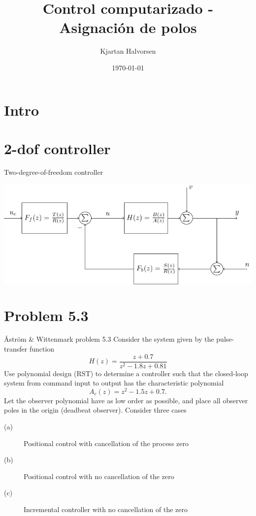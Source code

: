 \documentclass[presentation,aspectratio=169]{beamer}
\author{Kjartan Halvorsen}
\date{\today}
\title{Control computarizado - Asignación de polos}
\begin{document}
\maketitle

\section{Intro}
\label{sec:org70d5d08}


\section{2-dof controller}
\label{sec:org70b8192}

\begin{frame}[label={sec:orga124e5e}]{Two-degree-of-freedom controller}
\begin{center}
\includegraphics[width=0.8\linewidth]{../../figures/2dof-block-explicit-no-delay}
\end{center}
\end{frame}

\section{Problem 5.3}
\label{sec:orga34f588}
\begin{frame}[label={sec:org4d6f90f}]{Åström \& Wittenmark problem 5.3}
Consider the system given by the pulse-transfer function
\[ H(z) = \frac{z+0.7}{z^2 -1.8z + 0.81} \]
Use polynomial design (RST) to determine a controller such that the closed-loop system from command input to output has the characteristic polynomial
\[ A_c(z) = z^2 - 1.5z + 0.7. \]
Let the observer polynomial have as low order as possible, and place all observer poles in the origin (deadbeat observer). Consider three cases
\begin{description}
\item[{(a)}] Positional control with cancellation of the process zero
\item[{(b)}] Positional control with no cancellation of the zero
\item[{(c)}] Incremental controller with  no cancellation of the zero
\end{description}
\end{frame}
\end{document}
